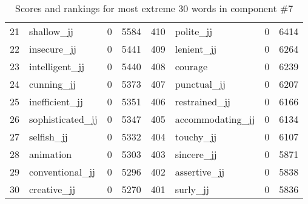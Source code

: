 \begin{table}[tbp]
\begin{tabular}{| rlr@{.}l | rlr@{.}l |}
    21 & shallow\_jj & 0 & 5584    &    410 & polite\_jj & 0 & 6414 \\
    22 & insecure\_jj & 0 & 5441    &    409 & lenient\_jj & 0 & 6264 \\
    23 & intelligent\_jj & 0 & 5440    &    408 & courage & 0 & 6239 \\
    24 & cunning\_jj & 0 & 5373    &    407 & punctual\_jj & 0 & 6207 \\
    25 & inefficient\_jj & 0 & 5351    &    406 & restrained\_jj & 0 & 6166 \\
    26 & sophisticated\_jj & 0 & 5347    &    405 & accommodating\_jj & 0 & 6134 \\
    27 & selfish\_jj & 0 & 5332    &    404 & touchy\_jj & 0 & 6107 \\
    28 & animation & 0 & 5303    &    403 & sincere\_jj & 0 & 5871 \\
    29 & conventional\_jj & 0 & 5296    &    402 & assertive\_jj & 0 & 5838 \\
    30 & creative\_jj & 0 & 5270    &    401 & surly\_jj & 0 & 5836 \\
    \hline
    \end{tabular}
    \caption{Scores and rankings for most extreme 30 words in component \#7} 
\end{table}
\clearpage
